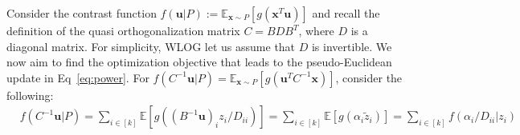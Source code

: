 \documentclass[letterpaper]{article}
\newcommand{\ba}[1]{\begin{align}#1\end{align}}
\newcommand{\bas}[1]{\begin{align*}#1\end{align*}}
\newcommand{\bu}{\pmb{u}}
\newcommand{\bx}{\pmb{x}}
\newcommand{\bg}{\pmb{g}}
\newcommand{\bz}{\pmb{z}}
\newcommand{\E}{\mathbb{E}}
\newcommand{\bb}[1]{\left(#1\right)}
\newcommand{\bbb}[1]{\left[#1\right]}
\begin{document}
Consider the contrast function $f\bb{\bu|P} := \E_{\bx\sim P}\bbb{g\bb{\bx^{T}\bu}}$ and recall the definition of the quasi orthogonalization matrix $C = BDB^{T}$, where $D$ is a diagonal matrix. For simplicity, WLOG let us assume that $D$ is invertible. 
We now aim to find the optimization objective that leads to the pseudo-Euclidean update in Eq~\ref{eq:power}.  For $f\bb{C^{-1}\bu|P} = \E_{\bx\sim P} \bbb{g\bb{\bu^{T}C^{-1}\bx}}$, consider the following:
\ba{
    &f\bb{C^{-1}\bu|P} = \sum_{i \in [k]}\E\bbb{g\bb{\bb{B^{-1}\bu}_{i}z_{i}/D_{ii}}} = \sum_{i \in [k]}\E \bbb{g\bb{\alpha_i\tilde{z}_i}} 
    = \sum_{i \in [k]}f\bb{\alpha_i/D_{ii}|z_i} \label{eq:powerobj}
}
\end{document}
